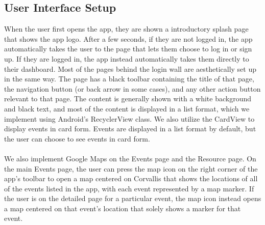 \documentclass[draftclsnofoot, onecolumn, 10pt, compsoc]{IEEEtran}
\begin{document}
      \subsection{User Interface Setup}
         When the user first opens the app, they are shown a introductory splash page that shows the app logo. After a few seconds, if they are not logged in, the app automatically takes the user to the page that lets them choose to log in or sign up. If they are logged in, the app instead automatically takes them directly to their dashboard. Most of the pages behind the login wall are aesthetically set up in the same way. The page has a black toolbar containing the title of that page, the navigation button (or back arrow in some cases), and any other action button relevant to that page. The content is generally shown with a white background and black text, and most of the content is displayed in a list format, which we implement using Android’s RecyclerView class. We also utilize the CardView to display events in card form. Events are displayed in a list format by default, but the user can choose to see events in card form. \\ \\
	      We also implement Google Maps on the Events page and the Resource page. On the main Events page, the user can press the map icon on the right corner of the app’s toolbar to open a map centered on Corvallis that shows the locations of all of the events listed in the app, with each event represented by a map marker. If the user is on the detailed page for a particular event, the map icon instead opens a map centered on that event’s location that solely shows a marker for that event.
\end{document}
